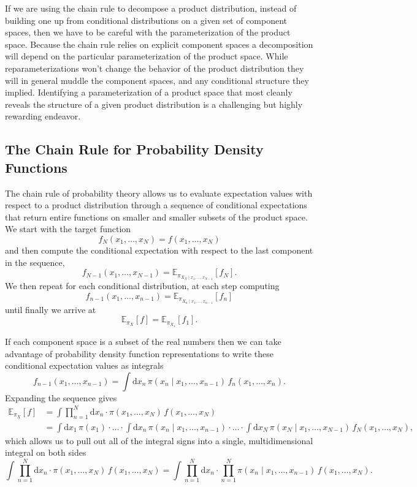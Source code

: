 \documentclass[]{article}
\begin{document}
If we are using the chain rule to decompose a product distribution,
instead of building one up from conditional distributions on a given set
of component spaces, then we have to be careful with the
parameterization of the product space. Because the chain rule relies on
explicit component spaces a decomposition will depend on the particular
parameterization of the product space. While reparameterizations won't
change the behavior of the product distribution they will in general
muddle the component spaces, and any conditional structure they implied.
Identifying a parameterization of a product space that most cleanly
reveals the structure of a given product distribution is a challenging
but highly rewarding endeavor.

\hypertarget{the-chain-rule-for-probability-density-functions}{%
\subsection{The Chain Rule for Probability Density
Functions}\label{the-chain-rule-for-probability-density-functions}}

The chain rule of probability theory allows us to evaluate expectation
values with respect to a product distribution through a sequence of
conditional expectations that return entire functions on smaller and
smaller subsets of the product space. We start with the target function
\[
f_{N}(x_{1}, \ldots, x_{N}) = f(x_{1}, \ldots, x_{N})
\] and then compute the conditional expectation with respect to the last
component in the sequence, \[
f_{N - 1}(x_{1}, \ldots, x_{N - 1})
=
\mathbb{E}_{\pi_{X_{N} \mid x_{1}, \ldots, x_{N - 1}}} [ f_{N} ].
\] We then repeat for each conditional distribution, at each step
computing \[
f_{n - 1}(x_1, \ldots, x_{n - 1})
=
\mathbb{E}_{\pi_{X_{n} \mid x_1, \ldots, x_{n - 1}}} [ f_{n} ]
\] until finally we arrive at \[
\mathbb{E}_{\pi_{X}} [ f ]
=
\mathbb{E}_{\pi_{X_{1}}} [ f_{1} ].
\]

If each component space is a subset of the real numbers then we can take
advantage of probability density function representations to write these
conditional expectation values as integrals \[
f_{n - 1}(x_1, \ldots, x_{n - 1})
=
\int \mathrm{d} x_{n} \, \pi(x_{n} \mid x_1, \ldots, x_{n - 1}) \, f_{n} (x_{1}, \ldots, x_{n}).
\] Expanding the sequence gives \[
\begin{aligned}
\mathbb{E}_{\pi_{X}} [ f ]
&=
\int \prod_{n = 1}^{N} \mathrm{d} x_{n} \cdot
\pi(x_{1}, \ldots, x_{N}) \, f(x_{1}, \ldots, x_{N})
\\
&=
\int \mathrm{d} x_{1} \, \pi(x_{1}) \cdot \ldots \cdot
\int \mathrm{d} x_{n} \, \pi(x_{n} \mid x_1, \ldots, x_{n - 1}) \cdot \ldots \cdot
\int \mathrm{d} x_{N} \, \pi(x_{N} \mid x_{1}, \ldots, x_{N - 1}) \, f_{N} (x_{1}, \ldots, x_{N}),
\end{aligned}
\] which allows us to pull out all of the integral signs into a single,
multidimensional integral on both sides \[
\int \prod_{n = 1}^{N} \mathrm{d} x_{n} \cdot
\pi(x_{1}, \ldots, x_{N}) \, f(x_{1}, \ldots, x_{N})
=
\int \prod_{n = 1}^{N} \mathrm{d} x_{n} \cdot
\prod_{n = 1}^{N} \pi(x_{n} \mid x_{1}, \ldots, x_{n - 1}) \, f(x_{1}, \ldots, x_{N}).
\]
\end{document}
